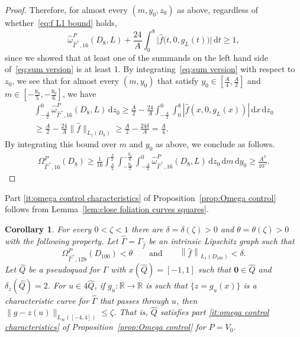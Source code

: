 \documentclass[11pt,reqno]{amsart}
\newcommand{\wwidehat}[1]{\widehat{#1}}
\newcommand{\R}{\mathbb{R}}
\newcommand{\ud}[0]{\,\mathrm{d}}
\newcommand{\0}{\mathbf{0}}
\renewcommand{\1}{\mathbf 1}
\newcommand{\from}{\colon}
\renewcommand{\ge}{\geqslant}
\renewcommand{\le}{\leqslant}
\newtheorem{cor}[thm]{Corollary}
\theoremstyle{remark}
\begin{document}
\begin{proof}
  Therefore, for almost every $(m,y_0,z_0)$ as above, regardless of whether~\eqref{eq:f L1 bound} holds,
  \begin{equation}\label{eq:sum version}
  \wwidehat{\omega}^P_{\hat{\Gamma}^+,16}(D_8, L)+\frac{24}{A}\int_0^8 \big|\hat{f}\big(t,0,g_{L}(t)\big)\big| \ud t\ge 1,
  \end{equation}
  since we showed that at least one of the summands on the left hand side of~\eqref{eq:sum version} is at least 1.  By integrating~\eqref{eq:sum version} with respect to $z_0$, we see that for almost every $(m,y_0)$ that satisfy  $y_0\in [\frac{A}{4}, \frac{A}{2}]$ and $m\in [-\frac{y_0}{5}, -\frac{y_0}{6}]$, we have
  \begin{multline*}
    \int_{-\frac{A}{2}}^{0}\wwidehat{\omega}^P_{\hat{\Gamma}^+,16}(D_8, L)\ud z_0 \ge \frac{A}{2} - \frac{24}{A} \int_{-\frac{A}{2}}^{0} \int_0^8 |\hat{f}(x,0,g_L(x))| \ud x \ud z_0 \\ \ge \frac{A}{2}-\frac{24}{A} \|\hat{f}\|_{L_1(D_8)}\ge \frac{A}{2}-\frac{24\delta}{A}=\frac{A}{4}.
  \end{multline*}
  By integrating this bound over $m$ and $y_0$ as above, we conclude as follows.
  \begin{align*}
    \Omega^P_{\hat{\Gamma}^+,16}(D_8)
    \ge \frac{1}{16} \int_{\frac{A}{4}}^{\frac{A}{2}}\int_{-\frac{y_0}{5}}^{-\frac{y_0}{6}}\int_{-\frac{A}{2}}^{0} \wwidehat{\omega}^P_{\hat{\Gamma}^+,16}(D_8, L) \ud z_0\ud m \ud y_0
    \ge  \frac{A^3}{10^5}.\tag*{\qedhere}
  \end{align*}
\end{proof}

Part \ref{it:omega control characteristics} of Proposition~\ref{prop:Omega control} follows from Lemma~\ref{lem:close foliation curves squares}.
\begin{cor}\label{cor:omega char bounds}
  For every $0<\zeta<1$ there are $\delta=\delta(\zeta)>0$ and $\theta=\theta(\zeta)>0$ with the following property.  Let $\hat{\Gamma}=\Gamma_{\hat{f}}$ be an intrinsic Lipschitz graph such that
  $$\Omega^P_{\hat{\Gamma}^+,128}(D_{100})< \theta\qquad\mathrm{and}\qquad \left\|\hat{f}\right\|_{L_1(D_{100})}<\delta.$$
  Let $\hat{Q}$ be a pseudoquad for $\hat{\Gamma}$ with $x(\hat{Q})=[-1,1]$ such that $\mathbf{0}\in \hat{Q}$ and $\delta_z(\hat{Q})=2$.  For $u\in 4 \hat{Q}$, if $g_u\from \R\to \R$ is such that $\{z=g_u(x)\}$ is a characteristic curve for $\hat{\Gamma}$ that passes through $u$, then $\|g-z(u)\|_{L_\infty([-4,4])}\le \zeta$.  That is, $\hat{Q}$ satisfies part \ref{it:omega control characteristics} of Proposition~\ref{prop:Omega control} for $P=V_0$.
\end{cor}
\end{document}
